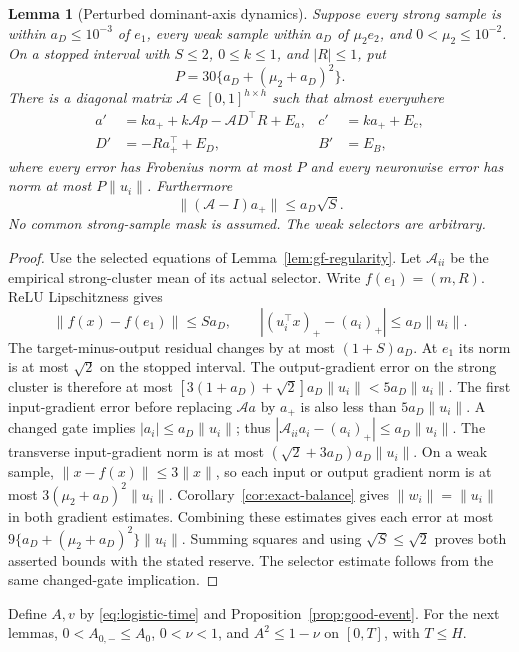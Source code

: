 \documentclass[10pt]{article}
\newtheorem{lemma}[theorem]{Lemma}
\theoremstyle{remark}\newtheorem{remark}[theorem]{Remark}
\begin{document}
\begin{lemma}[Perturbed dominant-axis dynamics]
\label{sbwide:axis-system}
Suppose every strong sample is within $a_D\le10^{-3}$ of $e_1$, every
weak sample within $a_D$ of $\mu_2e_2$, and $0<\mu_2\le10^{-2}$.
On a stopped interval with $S\le2$, $0\le k\le1$, and $|R|\le1$, put
\[
 P=30\{a_D+(\mu_2+a_D)^2\}.
\]
There is a diagonal matrix $\mathcal A\in[0,1]^{h\times h}$ such that
almost everywhere
\begin{align}\label{sbwide:perturbed-axis}
 a'&=ka_++k\mathcal A p-\mathcal A D^\top R+E_a,
 &c'&=ka_++E_c,\\
 D'&=-Ra_+^\top+E_D,
 &B'&=E_B,\nonumber
\end{align}
where every error has Frobenius norm at most $P$ and every neuronwise
error has norm at most $P\|u_i\|$. Furthermore
\[
 \|(\mathcal A-I)a_+\|\le a_D\sqrt S.
\]
No common strong-sample mask is assumed. The weak selectors are arbitrary.
\end{lemma}
\begin{proof}
Use the selected equations of Lemma~\ref{lem:gf-regularity}.
Let $\mathcal A_{ii}$ be the empirical strong-cluster mean of its actual
selector. Write $f(e_1)=(m,R)$. ReLU Lipschitzness gives
\[
 \|f(x)-f(e_1)\|\le Sa_D,\qquad
 |(u_i^\top x)_+-(a_i)_+|\le a_D\|u_i\|.
\]
The target-minus-output residual changes by at most $(1+S)a_D$.
At $e_1$ its norm is at most $\sqrt2$ on the stopped interval.
The output-gradient error on the strong cluster is therefore at most
$[3(1+a_D)+\sqrt2]a_D\|u_i\|<5a_D\|u_i\|$.
The first input-gradient error before replacing $\mathcal A a$ by $a_+$
is also less than $5a_D\|u_i\|$. A changed gate implies $|a_i|\le a_D\|u_i\|$;
thus $|\mathcal A_{ii}a_i-(a_i)_+|\le a_D\|u_i\|$.
The transverse input-gradient norm is at most
$(\sqrt2+3a_D)a_D\|u_i\|$.
On a weak sample, $\|x-f(x)\|\le3\|x\|$, so each input or output
gradient norm is at most $3(\mu_2+a_D)^2\|u_i\|$.
Corollary~\ref{cor:exact-balance} gives $\|w_i\|=\|u_i\|$ in both gradient estimates.
Combining these estimates gives each error at most
$9\{a_D+(\mu_2+a_D)^2\}\|u_i\|$.
Summing squares and using $\sqrt S\le\sqrt2$ proves both asserted
bounds with the stated reserve. The selector estimate follows from the
same changed-gate implication.
\end{proof}

Define $A,v$ by \eqref{eq:logistic-time} and Proposition~\ref{prop:good-event}.
For the next lemmas, $0<A_{0,-}\le A_0$, $0<\nu<1$, and
$A^2\le1-\nu$ on $[0,T]$, with $T\le H$.
\end{document}
